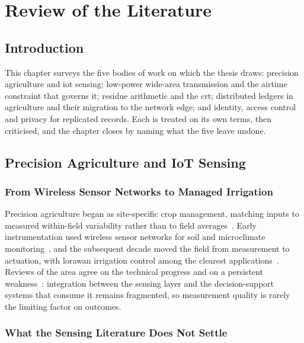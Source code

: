 \documentclass[12pt,a4paper,oneside]{book}
\begin{document}
\chapter{Review of the Literature}
\label{ch:literature}

\section{Introduction}
\label{sec:lit_intro}

This chapter surveys the five bodies of work on which the thesis draws:
precision agriculture and \gls{iot} sensing; low-power wide-area transmission
and the airtime constraint that governs it; residue arithmetic and the
\gls{crt}; distributed ledgers in agriculture and their migration to the
network edge; and identity, access control and privacy for replicated records.
Each is treated on its own terms, then criticised, and the chapter closes by
naming what the five leave undone.

\section{Precision Agriculture and IoT Sensing}
\label{sec:lit_precag}

\subsection{From Wireless Sensor Networks to Managed Irrigation}

Precision agriculture began as site-specific crop management, matching inputs
to measured within-field variability rather than to field
averages~\cite{pierce1999site, zhang2002precision}. Early instrumentation used
wireless sensor networks for soil and microclimate
monitoring~\cite{wang2006wireless, bogena2010soil}, and the subsequent decade
moved the field from measurement to actuation, with \gls{lorawan} irrigation
control among the clearest applications~\cite{evans2008precision}. Reviews of
the area agree on the technical progress and on a persistent
weakness~\cite{gebbers2010precision, aydin2021comprehensive}: integration
between the sensing layer and the decision-support systems that consume it
remains fragmented, so measurement quality is rarely the limiting factor on
outcomes.

\subsection{What the Sensing Literature Does Not Settle}
\end{document}
